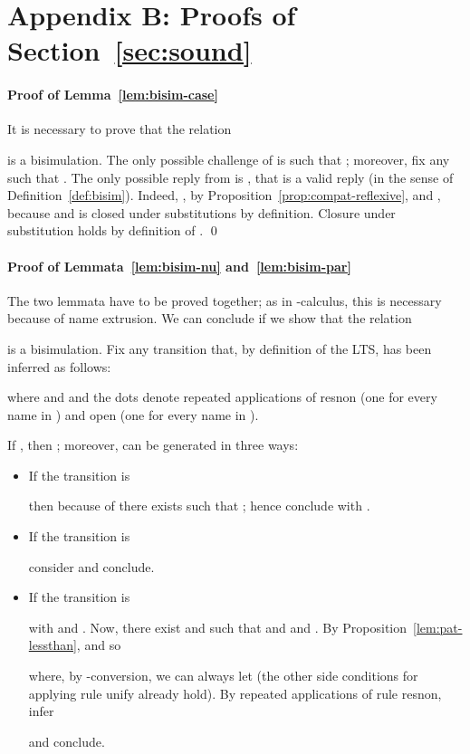 \documentclass{LMCS}
\begin{document}
\section*{Appendix B: Proofs of Section~\ref{sec:sound}}

\paragraph{Proof of Lemma~\ref{lem:bisim-case}}
It is necessary to prove that the relation

is a bisimulation. The only possible challenge of  is
 such that ;
moreover, fix any  such that .
The only possible reply from  is , that is
a valid reply (in the sense of Definition~\ref {def:bisim}). Indeed,
, by Proposition~\ref{prop:compat-reflexive},
and , because  and 
 is closed under substitutions by definition.
Closure under substitution holds by definition of .
\qed

\paragraph{Proof of Lemmata~\ref{lem:bisim-nu} and~\ref{lem:bisim-par}}
The two lemmata have to be proved together; as in -calculus, this is necessary because of name extrusion.
We can conclude if we show that the relation

is a bisimulation.
Fix any transition  that,
by definition of the LTS, has been inferred as follows:

where  and  and
the dots denote repeated applications of {\sf resnon} (one for every name in ) 
and {\sf open} (one for every name in ).

If , then ; moreover,  can
be generated in three ways:
\begin{itemize}
\item If the transition is
	
	then because of  there exists 
        such that ; hence conclude with
	.
\item If the transition is
	
	consider  and conclude.
\item If the transition is
	
	with  and
	.
	Now, there exist  and  such that  and
	 and .
	By Proposition~\ref{lem:pat-lessthan}, 
	and so
	
	where, by -conversion, we can always let 
	(the other side conditions for applying rule {\sf unify} already hold).
	By repeated applications of rule {\sf resnon}, infer 
	
	and conclude.
\end{itemize}
\end{document}

